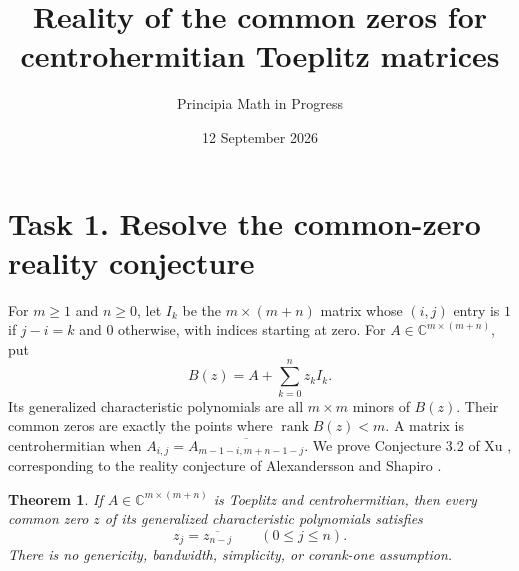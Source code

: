 \documentclass[11pt]{article}
\title{Reality of the common zeros for centrohermitian Toeplitz matrices}
\author{Principia Math in Progress}
\date{12 September 2026}
\newtheorem{theorem}{Theorem}
\newcommand{\rank}{\operatorname{rank}}
\begin{document}
\maketitle

\section*{Task 1. Resolve the common-zero reality conjecture}
For $m\geq1$ and $n\geq0$, let $I_k$ be the $m\times(m+n)$ matrix
whose $(i,j)$ entry is $1$ if $j-i=k$ and $0$ otherwise, with indices
starting at zero. For $A\in\mathbb C^{m\times(m+n)}$, put
\[
 B(z)=A+\sum_{k=0}^n z_k I_k.
\]
Its generalized characteristic polynomials are all $m\times m$ minors
of $B(z)$. Their common zeros are exactly the points where $\rank B(z)<m$.
A matrix is centrohermitian when
$A_{i,j}=\overline{A_{m-1-i,m+n-1-j}}$.
We prove Conjecture 3.2 of Xu \cite{Xu}, corresponding to the reality
conjecture of Alexandersson and Shapiro \cite{AS}.

\begin{theorem}
If $A\in\mathbb C^{m\times(m+n)}$ is Toeplitz and centrohermitian,
then every common zero $z$ of its generalized characteristic polynomials
satisfies
\[
 z_j=\overline{z_{n-j}}\qquad(0\leq j\leq n).
\]
There is no genericity, bandwidth, simplicity, or corank-one assumption.
\end{theorem}
\end{document}
